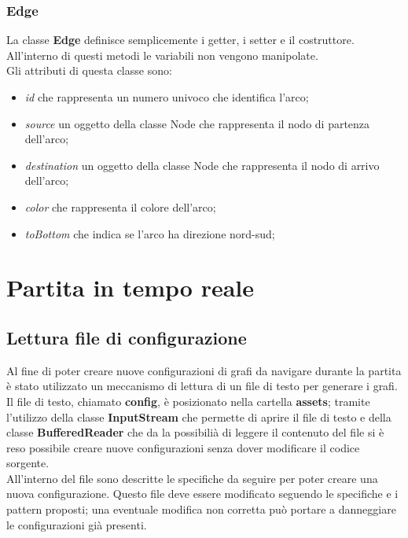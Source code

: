 \documentclass[a4paper,11pt,twoside,openright]{report}
\begin{document}
\subsection{Edge}
La classe \textbf{Edge} definisce semplicemente i getter, i setter e il costruttore. All'interno di questi metodi le variabili non vengono manipolate.\\
Gli attributi di questa classe sono:

\begin{itemize}
\item \textit{id} che rappresenta un numero univoco che identifica l'arco;

\item \textit{source} un oggetto della classe Node che rappresenta il nodo di partenza dell'arco;

\item \textit{destination} un oggetto della classe Node che rappresenta il nodo di arrivo dell'arco;

\item \textit{color} che rappresenta il colore dell'arco;

\item \textit{toBottom} che indica se l'arco ha direzione nord-sud;
\end{itemize}

\chapter{Partita in tempo reale}
\section{Lettura file di configurazione}
Al fine di poter creare nuove configurazioni di grafi da navigare durante la partita è stato utilizzato un meccanismo di lettura di un file di testo per generare i grafi.\\
Il file di testo, chiamato \textbf{config}, è posizionato nella cartella \textbf{assets}; tramite l'utilizzo della classe \textbf{InputStream} che permette di aprire il file di testo e della classe \textbf{BufferedReader} che da la possibilià di leggere il contenuto del file si è reso possibile creare nuove configurazioni senza dover modificare il codice sorgente.\\
All'interno del file sono descritte le specifiche da seguire per poter creare una nuova configurazione. Questo file deve essere modificato seguendo le specifiche e i pattern proposti; una eventuale modifica non corretta può portare a danneggiare le configurazioni già presenti.\\
\end{document}
